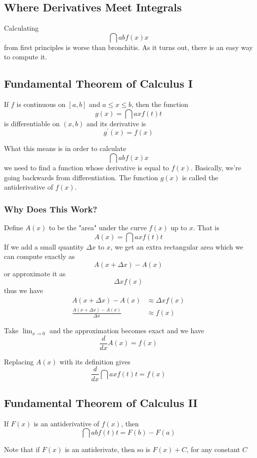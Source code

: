 \documentclass[12pt]{article}
\begin{document}
\subsection*{Where Derivatives Meet Integrals}
Calculating \[ \dint{a}{b}{f(x)}{x} \] from first principles is worse than bronchitis. As it turns out, there is an easy way to compute it.

\subsection*{Fundamental Theorem of Calculus I}
If $f$ is continuous on $[a,b]$ and $a \leq x \leq b$, then the function \[ g(x) = \dint{a}{x}{f(t)}{t} \] is differentiable on $(x,b)$ and its derivative is \[ g^\prime(x) = f(x) \]

What this means is in order to calculate \[ \dint{a}{b}{f(x)}{x} \] we need to find a function whose derivative is equal to $f(x)$. Basically, we're going backwards from differentiation. The function $g(x)$ is called the antiderivative of $f(x)$.

\subsubsection*{Why Does This Work?}
Define $A(x)$ to be the "area" under the curve $f(x)$ up to $x$. That is \[ A(x) = \dint{a}{x}{f(t)}{t} \] If we add a small quantity $\Delta x$ to $x$, we get an extra rectangular area which we can compute exactly as \[ A(x+\Delta x) - A(x) \] or approximate it as \[ \Delta xf(x) \] thus we have
\begin{align*}
A(x+\Delta x) - A(x) &\approx \Delta xf(x)\\
\frac{A(x+\Delta x) - A(x)}{\Delta x} &\approx f(x)
\end{align*}

Take $\displaystyle\lim_{x\to 0}$ and the approximation becomes exact and we have \[ \frac{d}{dx}A(x) = f(x) \]

Replacing $A(x)$ with its definition gives \[ \frac{d}{dx}\dint{a}{x}{f(t)}{t} = f(x) \]

\subsection*{Fundamental Theorem of Calculus II}
If $F(x)$ is an antiderivative of $f(x)$, then \[ \dint{a}{b}{f(t)}{t} = F(b) - F(a) \]

Note that if $F(x)$ is an antiderivate, then so is $F(x) + C$, for any constant $C$
\end{document}
